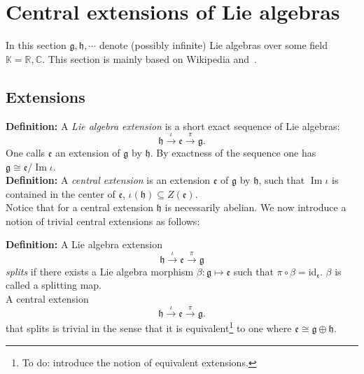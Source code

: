 \documentclass[submission, PhysLectNotes]{SciPost}
\DeclareMathOperator{\Ima}{Im}
\begin{document}
\section{Central extensions of Lie algebras}
In this section $\mathfrak{g},\mathfrak{h},\cdots $ denote (possibly infinite) Lie algebras over some field $\mathbb{K} = \mathbb{R}, \mathbb{C}$. This section is mainly based on Wikipedia and~\cite{Schottenloher}.


\subsection{Extensions}
{\bf Definition:} A \emph{Lie algebra extension} is a short exact sequence of Lie algebras:
\begin{equation}
	\mathfrak{h}\overset{\iota}{\rightarrow}\mathfrak{e}\overset{\pi}{\rightarrow}\mathfrak{g}.
\end{equation}
One calls $\mathfrak{e}$ an extension of $\mathfrak{g}$ by $\mathfrak{h}$. By exactness of the sequence one has $\mathfrak{g}\cong\mathfrak{e}\slash\Ima\iota$.\\

{\bf Definition:} A \emph{central extension} is an extension $\mathfrak{e}$ of $\mathfrak{g}$ by $\mathfrak{h}$, such that $\Ima \iota$ is contained in the center of $\mathfrak{e}$, $\iota(\mathfrak{h})\subseteq Z(\mathfrak{e})$.\\

Notice that for a central extension $\mathfrak{h}$ is necessarily abelian. We now introduce a notion of trivial central extensions as follows:

{\bf Definition:} A Lie algebra extension
\begin{equation}
	\mathfrak{h}\overset{\iota}{\rightarrow}\mathfrak{e}\overset{\pi}{\rightarrow}\mathfrak{g}
\end{equation}
\emph{splits} if there exists a Lie algebra morphism $\beta: \mathfrak{g}\mapsto\mathfrak{e}$ such that $\pi\circ\beta = \text{id}_{\mathfrak{e}}$. $\beta$ is called a splitting map.\\

A central extension
\begin{equation}
	\mathfrak{h}\overset{\iota}{\rightarrow}\mathfrak{e}\overset{\pi}{\rightarrow}\mathfrak{g}.
\end{equation}
that splits is trivial in the sense that it is equivalent\footnote{To do: introduce the notion of equivalent extensions.} to one where $\mathfrak{e}\cong\mathfrak{g}\oplus\mathfrak{h}$.\\
\end{document}

